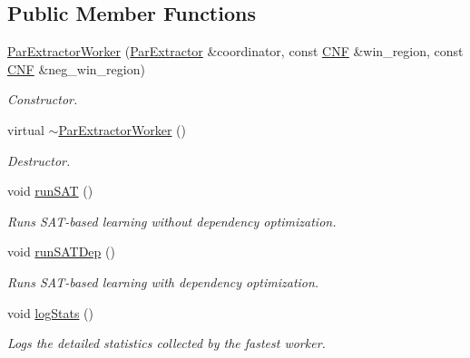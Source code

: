 \subsection*{Public Member Functions}
\begin{DoxyCompactItemize}
\item 
\hyperlink{classParExtractorWorker_aec32f8b52073c6985778ad5797d7da7f}{Par\-Extractor\-Worker} (\hyperlink{classParExtractor}{Par\-Extractor} \&coordinator, const \hyperlink{classCNF}{C\-N\-F} \&win\-\_\-region, const \hyperlink{classCNF}{C\-N\-F} \&neg\-\_\-win\-\_\-region)
\begin{DoxyCompactList}\small\item\em Constructor. \end{DoxyCompactList}\item 
virtual \hyperlink{classParExtractorWorker_a4cc66c5ca37732c18e8fcc65974f4e7d}{$\sim$\-Par\-Extractor\-Worker} ()
\begin{DoxyCompactList}\small\item\em Destructor. \end{DoxyCompactList}\item 
void \hyperlink{classParExtractorWorker_a58a6a251869b24e00b8b3dec0990feab}{run\-S\-A\-T} ()
\begin{DoxyCompactList}\small\item\em Runs S\-A\-T-\/based learning without dependency optimization. \end{DoxyCompactList}\item 
void \hyperlink{classParExtractorWorker_ae1d9c00159b3f4586f27f8493f558a5b}{run\-S\-A\-T\-Dep} ()
\begin{DoxyCompactList}\small\item\em Runs S\-A\-T-\/based learning with dependency optimization. \end{DoxyCompactList}\item 
void \hyperlink{classParExtractorWorker_aeea72a7e0c9562187c46223ddce4b65f}{log\-Stats} ()
\begin{DoxyCompactList}\small\item\em Logs the detailed statistics collected by the fastest worker. \end{DoxyCompactList}\end{DoxyCompactItemize}
